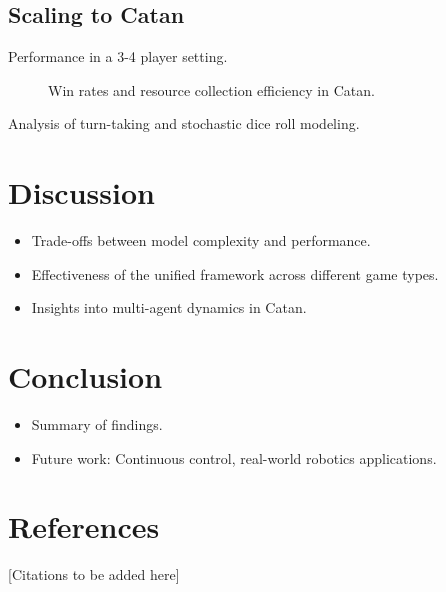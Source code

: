 \documentclass[twocolumn,10pt]{article}
\begin{document}
\subsection{Scaling to Catan}
Performance in a 3-4 player setting.
\begin{figure}[h]
    \centering
    \caption{Win rates and resource collection efficiency in Catan.}
    \label{fig:catan}
\end{figure}
Analysis of turn-taking and stochastic dice roll modeling.

\section{Discussion}
\begin{itemize}
    \item Trade-offs between model complexity and performance.
    \item Effectiveness of the unified framework across different game types.
    \item Insights into multi-agent dynamics in Catan.
\end{itemize}

\section{Conclusion}
\begin{itemize}
    \item Summary of findings.
    \item Future work: Continuous control, real-world robotics applications.
\end{itemize}

\section{References}
[Citations to be added here]
\end{document}
